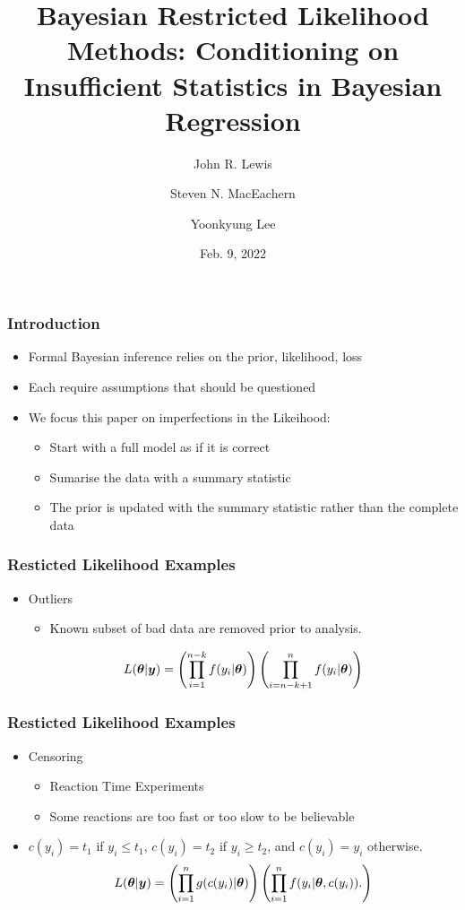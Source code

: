 \documentclass{beamer}
\title{Bayesian Restricted Likelihood Methods: Conditioning on Insufficient Statistics in Bayesian Regression}
\author{John R. Lewis \and Steven N. MacEachern \and Yoonkyung Lee}
\institute{Department of Statistics, The Ohio State University}
\date{Feb. 9, 2022}
\def\bth{\mbox{\boldmath $\theta$}}
\newcommand{\by}{\mbox{\boldmath $y$}}
\begin{document}
	
\frame{\titlepage}

\begin{frame}
\frametitle{Introduction}

\begin{itemize}
\item Formal Bayesian inference relies on the prior, likelihood, loss
\item Each require assumptions that should be questioned
\item We focus this paper on imperfections in the Likeihood:

\begin{itemize}
\item Start with a full model as if it is correct

\item Sumarise the data with a summary statistic

\item The prior is updated with the summary statistic rather than the complete data
\end{itemize}
\end{itemize}
\end{frame}
	

\begin{frame}
\frametitle{Resticted Likelihood Examples}

\begin{itemize}
	\item Outliers
\begin{itemize}
	\item Known subset of bad data are removed prior to analysis. 
\end{itemize}
\begin{eqnarray*}
	\label{OutlyingCases}
	L(\bth | \by)  
	= \left( \prod_{i=1}^{n-k} f(y_i | \bth) \right) \left( \prod_{i=n-k+1}^{n} f(y_i | \bth) \right) 
\end{eqnarray*}
\end{itemize}
\end{frame}

\begin{frame}
\frametitle{Resticted Likelihood Examples}

\begin{itemize}
	\item Censoring 
\begin{itemize}
		\item Reaction Time Experiments \citep[e.g.,][]{ratcliff1993}
		\item Some reactions are too fast or too slow to be believable
\end{itemize}
\item $c(y_i)= t_1$ if $y_i \leq t_1$, $c(y_i)=t_2$ 
if $y_i \geq t_2$, and $c(y_i)=y_i$ otherwise.
\begin{eqnarray*}
\label{Censoring} 
L(\bth  | \by) =  \left( \prod_{i=1}^n g(c(y_i)  | \bth) \right) \left( \prod_{i=1}^n f(y_i|\bth,c(y_i)). \right) 
\end{eqnarray*}
\end{itemize}

\end{frame}
\end{document}
